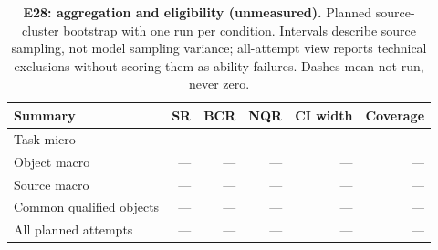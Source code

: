 \begin{table}[!ht]
\centering\small
\caption{\textbf{E28: aggregation and eligibility (unmeasured).} Planned source-cluster bootstrap with one run per condition. Intervals describe source sampling, not model sampling variance; all-attempt view reports technical exclusions without scoring them as ability failures. Dashes mean not run, never zero.}
\begin{tabularx}{\textwidth}{@{}Xrrrrr@{}}\toprule
Summary & SR & BCR & NQR & CI width & Coverage\\\midrule
Task micro & --- & --- & --- & --- & ---\\
Object macro & --- & --- & --- & --- & ---\\
Source macro & --- & --- & --- & --- & ---\\
Common qualified objects & --- & --- & --- & --- & ---\\
All planned attempts & --- & --- & --- & --- & ---\\
\bottomrule
\end{tabularx}
\end{table}
